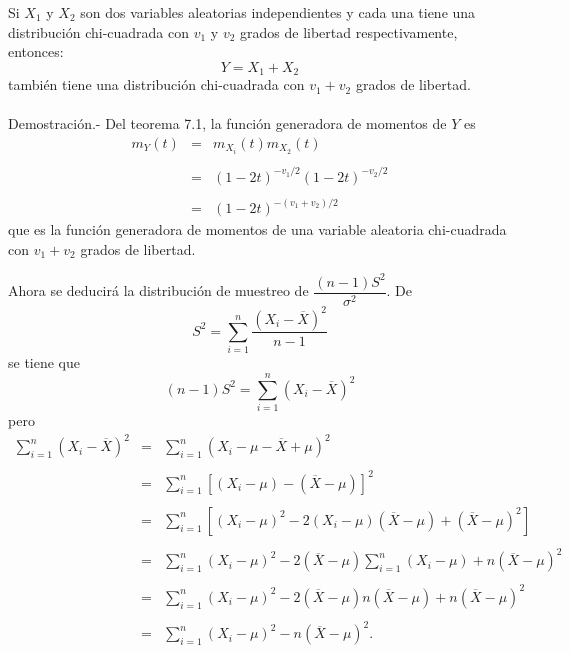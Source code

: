 \begin{teo}
    Si $X_1$ y $X_2$ son dos variables aleatorias independientes y cada una tiene una distribución chi-cuadrada con $v_1$ y $v_2$ grados de libertad respectivamente, entonces:
    $$Y=X_1+X_2$$
    también tiene una distribución chi-cuadrada con $v_1+v_2$ grados de libertad.\\\\
	Demostración.-\; Del teorema 7.1, la función generadora de momentos de $Y$ es
	$$
	\begin{array}{rcl}
	    m_Y(t) &=& m_{X_i}(t)m_{X_2}(t)\\\\
		   &=& (1-2t)^{-v_1/2} (1-2t)^{-v_2/2}\\\\
		   &=& (1-2t)^{-(v_1+v_2)/2}
	\end{array}
	$$
	que es la función generadora de momentos de una variable aleatoria chi-cuadrada con $v_1+v_2$ grados de libertad.
\end{teo}

Ahora se deducirá la distribución de muestreo de $\dfrac{(n-1)S^2}{\sigma^2}$. De  
$$S^2=\sum_{i=1}^n \dfrac{\left(X_i-\overline{X}\right)^2}{n-1}$$
se tiene que
$$(n-1)S^2=\sum_{i=1}^n \left(X_i-\overline{X}\right)^2$$
pero
$$
\begin{array}{rcl}
    \displaystyle\sum_{i=1}^n \left(X_i-\overline{X}\right)^2 &=& \displaystyle\sum_{i=1}^n \left(X_i-\mu-\overline{X}+\mu\right)^2\\\\
							      &=& \displaystyle\sum_{i=1}^n \left[(X_i-\mu)-(\overline{X}-\mu)\right]^2\\\\
							      &=& \displaystyle\sum_{i=1}^n \left[\left(X_i-\mu\right)^2-2\left(X_i-\mu\right)\left(\overline{X}-\mu\right)+\left(\overline{X}-\mu\right)^2\right]\\\\
							      &=& \displaystyle\sum_{i=1}^n \left(X_i-\mu\right)^2-2\left(\overline{X}-\mu\right) \displaystyle\sum_{i=1}^n \left(X_i-\mu\right)+n\left(\overline{X}-\mu\right)^2\\\\
							      &=&\displaystyle\sum_{i=1}^n\left(X_i-\mu\right)^2-2\left(\overline{X}-\mu\right)n\left(\overline{X}-\mu\right)+n\left(\overline{X}-\mu\right)^2\\\\
							      &=& \displaystyle\sum_{i=1}^n \left(X_i-\mu\right)^2-n\left(\overline{X}-\mu\right)^2.
\end{array}
$$

